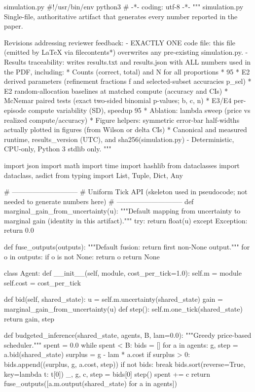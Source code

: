 \begin{filecontents*}{simulation.py}
#!/usr/bin/env python3
# -*- coding: utf-8 -*-
"""
simulation.py
Single-file, authoritative artifact that generates every number reported in the paper.

Revisions addressing reviewer feedback:
- EXACTLY ONE code file: this file (emitted by LaTeX via filecontents*) overwrites any pre-existing simulation.py.
- Results traceability: writes results.txt and results.json with ALL numbers used in the PDF, including:
  * Counts (correct, total) and N for all proportions
  * 95%
  * E2 derived parameters (refinement fractions f and selected-subset accuracies p_sel)
  * E2 random-allocation baselines at matched compute (accuracy and CIs)
  * McNemar paired tests (exact two-sided binomial p-values; b, c, n)
  * E3/E4 per-episode compute variability (SD), speedup 95%
  * Ablation: lambda sweep (price vs realized compute/accuracy)
  * Figure helpers: symmetric error-bar half-widths actually plotted in figures (from Wilson or delta CIs)
  * Canonical and measured runtime, results_version (UTC), and sha256(simulation.py)
- Deterministic, CPU-only, Python 3 stdlib only.
"""

import json
import math
import time
import hashlib
from dataclasses import dataclass, asdict
from typing import List, Tuple, Dict, Any


# -----------------------------
# Uniform Tick API (skeleton used in pseudocode; not needed to generate numbers here)
# -----------------------------
def marginal_gain_from_uncertainty(u):
    """Default mapping from uncertainty to marginal gain (identity in this artifact)."""
    try:
        return float(u)
    except Exception:
        return 0.0


def fuse_outputs(outputs):
    """Default fusion: return first non-None output."""
    for o in outputs:
        if o is not None:
            return o
    return None


class Agent:
    def __init__(self, module, cost_per_tick=1.0):
        self.m = module
        self.cost = cost_per_tick

    def bid(self, shared_state):
        u = self.m.uncertainty(shared_state)
        gain = marginal_gain_from_uncertainty(u)
        def step():
            self.m.one_tick(shared_state)
        return gain, step


def budgeted_inference(shared_state, agents, B, lam=0.0):
    """Greedy price-based scheduler."""
    spent = 0.0
    while spent < B:
        bids = []
        for a in agents:
            g, step = a.bid(shared_state)
            surplus = g - lam * a.cost
            if surplus > 0:
                bids.append((surplus, g, a.cost, step))
        if not bids:
            break
        bids.sort(reverse=True, key=lambda t: t[0])
        _, g, c, step = bids[0]
        step()
        spent += c
    return fuse_outputs([a.m.output(shared_state) for a in agents])



\end{filecontents*}
